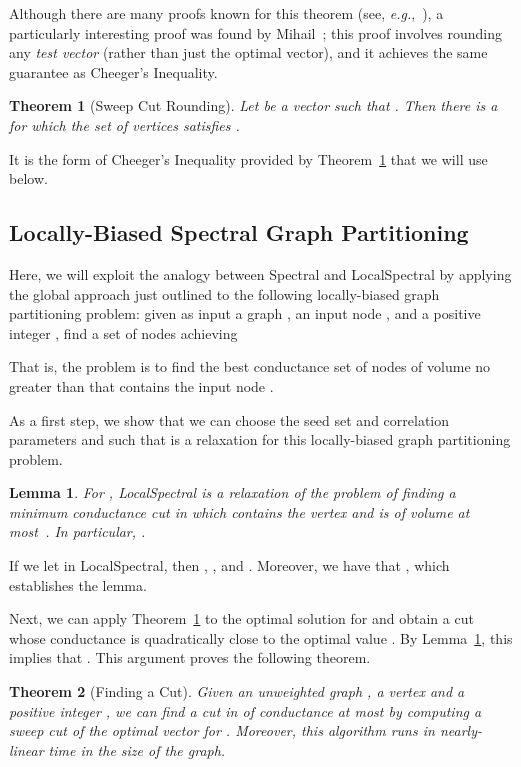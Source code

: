 \documentclass[11pt]{article}
\newtheorem{theorem}{Theorem}
\newtheorem{lemma}{Lemma}
\newenvironment{proof}{\noindent {\em Proof:}}{\\\hspace*{\fill}\mbox{}}
\begin{document}
\noindent
Although there are many proofs known for this theorem (see, 
\emph{e.g.},~\cite{Chung:1997}), a particularly interesting proof was 
found by Mihail~\cite{Mihail}; this proof involves rounding any \emph{test 
vector} (rather than just the optimal vector), and it achieves the same 
guarantee as Cheeger's Inequality. 
\begin{theorem}[Sweep Cut Rounding]
\label{thm:cheeger2}
Let  be a vector such that . Then there is a  for which 
the set of vertices  
satisfies .
\end{theorem}
It is the form of Cheeger's Inequality provided by Theorem~\ref{thm:cheeger2}
that we will use below.


\subsection{Locally-Biased Spectral Graph Partitioning}
\label{sxn:partition-local}

Here, we will exploit the analogy between \textsf{Spectral} and 
\textsf{LocalSpectral} by applying the global approach just outlined to the 
following locally-biased graph partitioning problem: 
given as input a graph , an input node , and a positive integer
, find a set of nodes  achieving

That is, the problem is to 
find the best conductance set of nodes of volume no greater 
than  that contains the input node . 

As a first step, we show that we can choose the seed set and correlation parameters  and  such 
that  is a relaxation for this 
locally-biased graph partitioning problem.
\begin{lemma}
\label{lem:relaxation}
For , \textsf{LocalSpectral} is a relaxation 
of the problem of finding a minimum conductance cut  in  which 
contains the vertex  and is of volume at most~.  
In particular, .
\end{lemma}
\begin{proof}
If we let  in 
\textsf{LocalSpectral}, 
then , , and 
.
Moreover, we have that 
,
which establishes the lemma. 
\end{proof}

\noindent
Next, we can apply Theorem~\ref{thm:cheeger2} to the optimal solution for 
 and obtain a cut  whose 
conductance is quadratically close to the optimal value 
. 
By Lemma~\ref{lem:relaxation}, this implies that 
.
This argument proves the following theorem.
\begin{theorem}[Finding a Cut]
\label{thm:cut} 
Given an unweighted graph , a vertex  and a positive 
integer , we can find a cut in  of conductance at most 
 by computing a sweep cut of the optimal vector for 
. 
Moreover, this algorithm runs in nearly-linear time in the size of the graph.
\end{theorem}
\end{document}

